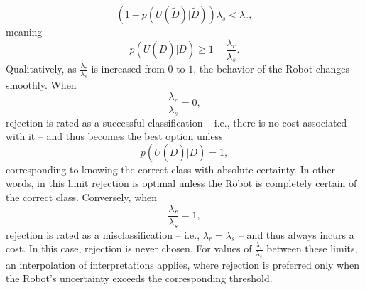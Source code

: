 \begin{example}
	\begin{equation}
		(1-p(U(\tilde{D})|\tilde{D}))\lambda_s< \lambda_r,
	\end{equation}
	meaning
	\begin{equation}
		p(U(\tilde{D})|\tilde{D})\geq 1-\frac{\lambda_r}{\lambda_s}.
	\end{equation}
	Qualitatively, as $\frac{\lambda_r}{\lambda_s}$ is increased from $0$ to $1$, the behavior of the Robot changes smoothly. When
	\begin{equation}
		\frac{\lambda_r}{\lambda_s}=0,
	\end{equation}
	rejection is rated as a successful classification -- i.e., there is no cost associated with it -- and thus becomes the best option unless
	\begin{equation}
		p(U(\tilde{D})|\tilde{D})=1,
	\end{equation}
	corresponding to knowing the correct class with absolute certainty. In other words, in this limit rejection is optimal unless the Robot is completely certain of the correct class. Conversely, when
	\begin{equation}
		\frac{\lambda_r}{\lambda_s}=1,
	\end{equation}
	rejection is rated as a misclassification -- i.e., $\lambda_r=\lambda_s$ -- and thus always incurs a cost. In this case, rejection is never chosen. For values of $\frac{\lambda_r}{\lambda_s}$ between these limits, an interpolation of interpretations applies, where rejection is preferred only when the Robot's uncertainty exceeds the corresponding threshold.
\end{example}
